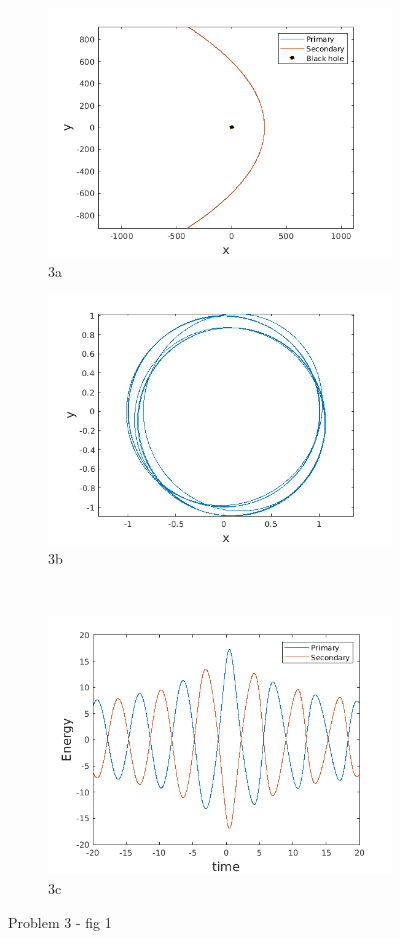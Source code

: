 \documentclass[a4paper]{article}
\begin{document}
		\begin{figure}
			\begin{subfigure} {.5\columnwidth}
				\includegraphics[width=\columnwidth]{../plots/3a_orbits_equalaxes.png}
				\caption{3a}
				\label{fig:3a}
			\end{subfigure}
			\hfill
			\begin{subfigure} {.5\columnwidth}
				\includegraphics[width=\columnwidth]{../plots/3b_secondaryorbit.png}
				\caption{3b}
				\label{fig:3b}
			\end{subfigure}\\
			
			\begin{subfigure} {\columnwidth}
				\centering
				\includegraphics[width=.5\columnwidth]{../plots/3c_energy.png}
				\caption{3c}
				\label{fig:3c}
			\end{subfigure}
			\caption{Problem 3 - fig 1}
			\label{fig:3.1}
		\end{figure}
	
\end{document}
